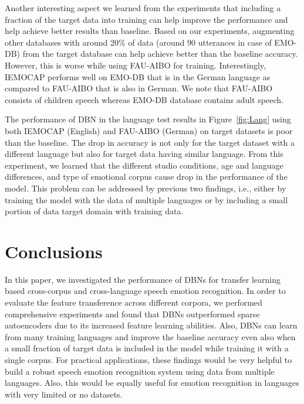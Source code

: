 \documentclass[a4paper]{article}
\newcommand*{\JE}[1]{\textcolor{magenta}{#1}}
\begin{document}
Another interesting aspect we learned from the experiments that including a fraction of the target data into training can help improve the performance and help achieve better results than baseline. %
Based on our experiments, augmenting other databases with around 20\% of data (around 90 utterances in case of EMO-DB) from the target database can help achieve better than the baseline accuracy. However, this is worse while using FAU-AIBO for training. Interestingly, IEMOCAP performs well on EMO-DB that is in the German language as compared to FAU-AIBO that is also in German. We note that FAU-AIBO consists of children speech whereas EMO-DB database contains adult speech.
 

The performance of DBN in the language test results in Figure~\ref{fig:Lang} using both IEMOCAP (English) and FAU-AIBO (German) on target datasets is poor than the baseline. The drop in accuracy is not only for the target dataset with a different language but also for target data having similar language. From this experiment, we learned that the different studio conditions, age and language differences, and type of emotional corpus cause drop in the performance of the model. This problem can be addressed by previous two findings, i.e., either by training the model with the data of multiple languages or by including a small portion of data target domain with training data. 





\section{Conclusions}
\label{sec: con}


In this paper, we investigated the performance of DBNs for transfer learning based cross-corpus and cross-language speech emotion recognition. In order to evaluate the feature transference across different corpora, we performed comprehensive experiments and found that DBNs outperformed sparse autoencoders due to its increased feature learning abilities. Also,  DBNs can learn from many training languages and improve the baseline accuracy even also when a small fraction of target data is included in the model while training it with a single corpus. For practical applications, these findings would be very helpful to build a robust speech emotion recognition system using data from multiple languages. Also, this would be equally useful for emotion recognition in languages with very limited or no datasets. 
\end{document}
